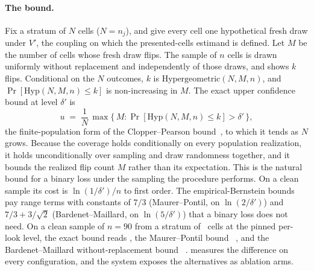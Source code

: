 \keeprunin
\paragraph{The bound.} Fix a stratum of $N$ cells ($N = n_j$), and give
every cell one hypothetical fresh draw under $V'$, the coupling on which
the presented-cells estimand is defined. Let $M$ be the number of cells
whose fresh draw flips. The sample of $n$ cells is drawn uniformly
without replacement and independently of those draws, and shows $k$
flips. Conditional on the $N$ outcomes, $k$ is
$\mathrm{Hypergeometric}(N, M, n)$, and
$\Pr[\mathrm{Hyp}(N, M, n) \le k]$ is non-increasing in $M$. The exact upper confidence bound at level
$\delta'$ is
\begin{equation}\label{eq:exact}
  u \;=\; \frac{1}{N}\,\max\bigl\{\, M : \Pr[\mathrm{Hyp}(N, M, n) \le k]
  > \delta' \,\bigr\},
\end{equation}
the finite-population form of the Clopper--Pearson
bound~\cite{clopper}, to which it tends as $N$ grows. Because the
coverage holds conditionally on every population realization, it holds
unconditionally over sampling and draw randomness together, and it
bounds the realized flip count $M$ rather than its expectation. This is
the natural bound for a binary loss under the sampling the procedure
performs. On a clean sample its cost is $\ln(1/\delta')/n$ to first
order. The empirical-Bernstein bounds pay range terms with constants of
$7/3$ (Maurer--Pontil, on $\ln(2/\delta')$) and $7/3 + 3/\sqrt{2}$
(Bardenet--Maillard, on $\ln(5/\delta')$) that a binary loss does not
need. On a clean sample of $n{=}90$ from a stratum of
\boundExactAtNStratum\ cells at the pinned per-look level, the exact
bound reads \boundExactAtN, the Maurer--Pontil bound~\cite{maurer}
\boundEbAtN, and the Bardenet--Maillard without-replacement
bound~\cite{bardenet} \boundWorAtN.  measures
the difference on every configuration, and the system exposes the
alternatives as ablation arms.

